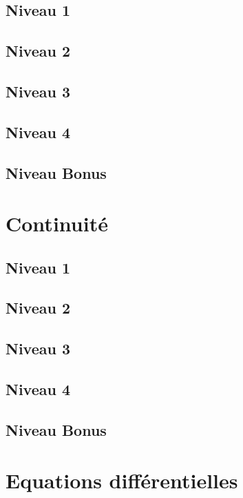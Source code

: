 \documentclass[a4paper]{report}
\begin{document}
			\subsection{Niveau 1}
		
			\subsection{Niveau 2}
		
			\subsection{Niveau 3}
			
			\subsection{Niveau 4}
			
			\subsection{Niveau Bonus}
		
		\section{Continuité}
		
			\subsection{Niveau 1}
		
			\subsection{Niveau 2}
		
			\subsection{Niveau 3}
			
			\subsection{Niveau 4}
			
			\subsection{Niveau Bonus}
			
		\section{Equations différentielles}
		
\end{document}
